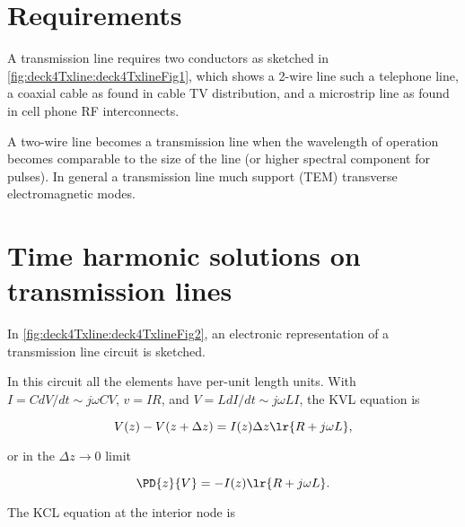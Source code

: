%
%
\section{Requirements}

A transmission line requires two conductors as sketched in \cref{fig:deck4Txline:deck4TxlineFig1}, which shows a 2-wire line such a telephone line, a coaxial cable as found in cable TV distribution, and a microstrip line as found in cell phone RF interconnects.


A two-wire line becomes a transmission line when the wavelength of operation becomes comparable to the size of the line (or higher spectral component for pulses).  In general a transmission line much support (TEM) transverse electromagnetic modes.

\section{Time harmonic solutions on transmission lines}

In \cref{fig:deck4Txline:deck4TxlineFig2}, an electronic representation of a transmission line circuit is sketched.


In this circuit all the elements have per-unit length units.  With \( I = C dV/dt \sim j \omega C V \), \( v = I R \), and \( V = L dI/dt \sim j \omega L I \), the KVL equation is

\begin{dmath}\label{eqn:uwaves4TransmissionLines:20}
V(z) - V(z + \Delta z) = I(z) \Delta z \lr{ R + j \omega L },
\end{dmath}

or in the \( \Delta z \rightarrow 0 \) limit

\begin{dmath}\label{eqn:uwaves4TransmissionLines:40}
\PD{z}{V} = -I(z) \lr{ R + j \omega L }.
\end{dmath}

The KCL equation at the interior node is

